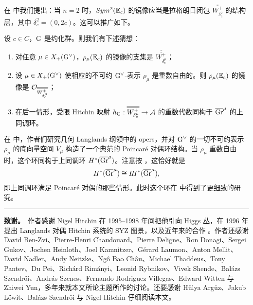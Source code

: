 在 \cite[\S 8.2]{hausel-hitchin} 中我们提出：当 $n=2$ 时，$Sym^2(\mathbb{E}_c)$ 的镜像应当是拉格朗日闭包 $\overline{\overline{W^+_{\delta_{c}^2}}}$ 的结构层，其中 $\delta_{c}^2=(0,2c)$。这可以推广如下。

\begin{conjecture}\label{geomsati}
设 $c\in C$，$\mathrm{G}$ 是约化群。则我们有下述猜想：
\begin{enumerate}
	\item 对任意 $\mu\in X_+(\mathrm{G}^\vee)$，$\rho_\mu({\mathbb{E}}_c)$ 的镜像的支集是 $\overline{\overline{W^+_{\delta_c^\mu}}}$；
	\item 设 $\mu\in X_+(\mathrm{G}^\vee)$ 使相应的不可约 $\mathrm{G}^\vee$-表示 $\rho_\mu$ 是重数自由的。则 $\rho_\mu({\mathbb{E}}_c)$ 的镜像是 ${\mathcal O}_{\overline{\overline{W^+_{\delta_c^\mu}}}}$；
	\item 在后一情形，受限 Hitchin 映射 $h_{\mathrm{G}}:\overline{\overline{W^+_{\delta_c^\mu}}}\to {\mathcal{A}}$ 的重数代数同构于 $\overline{\textnormal{Gr}}^\mu$ 的上同调环。
\end{enumerate}
\end{conjecture}

\begin{remark}
在 \cite{feigin-frenkel-rybnikov} 中，作者们研究几何 Langlands 纲领中的 opers，并对 $\mathrm{G}^\vee$ 的一切不可约表示 $\rho_\mu$ 的底向量空间 $V_\mu$ 构造了一个典范的 Poincaré 对偶环结构。当 $\rho_\mu$ 重数自由时，这个环同构于上同调环 $H^*(\overline{\textnormal{Gr}}^\mu)$。注意按 \cite[Theorem 1.5]{ginzburg}，这恰好就是
\[
H^*(\overline{\textnormal{Gr}}^\mu)\cong  I\!H^*(\overline{\textnormal{Gr}}^\mu),
\]
即上同调环满足 Poincaré 对偶的那些情形。此时这个环在 \cite{panyushev} 中得到了更细致的研究。
\end{remark}


\begin{center}
\rule{0.55\textwidth}{0.4pt}
\end{center}

\noindent\textbf{致谢。}\ 作者感谢 Nigel Hitchin 在 1995--1998 年间把他引向 Higgs 丛，在 1996 年提出 Langlands 对偶 Hitchin 系统的 SYZ 图景，以及近年来的合作 \cite{hausel-hitchin,hausel-hitchin1}。作者还感谢 David Ben-Zvi、Pierre-Henri Chaudouard、Pierre Deligne、Ron Donagi、Sergei Gukov、Jochen Heinloth、Joel Kamnitzer、G\'erard Laumon、Anton Mellit、David Nadler、Andy Neitzke、Ng\^{o} Bao Ch\^au、Michael Thaddeus、Tony Pantev、Du Pei、Rich\'ard Rim\'anyi、Leonid Rybnikov、Vivek Shende、Bal\'azs Szendr\H{o}i、Andr\'as Szenes、Fernando Rodriguez-Villegas、Edward Witten 与 Zhiwei Yun，多年来就本文所论主题所作的讨论。还要感谢 H\"ulya Arg\"uz、Jakub L\"owit、Bal\'azs Szendr\H{o}i 与 Nigel Hitchin 仔细阅读本文。
